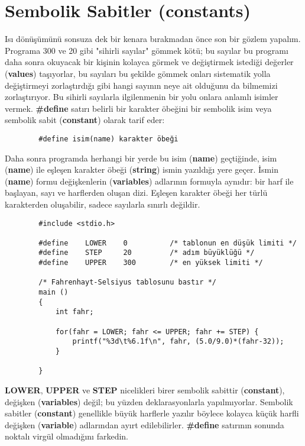 \documentclass[a4paper,12pt,oneside]{book}
\begin{document}
\section{Sembolik Sabitler (constants)}

\par Isı dönüşümünü sonsuza dek bir kenara bırakmadan önce son bir gözlem yapalım. Programa 300 ve 20 gibi "sihirli sayılar" gömmek kötü; bu sayılar bu programı daha sonra okuyacak bir kişinin kolayca görmek ve değiştirmek istediği değerler (\textbf{values}) taşıyorlar, bu sayıları bu şekilde gömmek onları sistematik yolla değiştirmeyi zorlaştırdığı gibi hangi sayının neye ait olduğunu da bilmemizi zorlaştırıyor. Bu sihirli sayılarla ilgilenmenin bir yolu onlara anlamlı isimler vermek. \textbf{\#define} satırı belirli bir karakter öbeğini bir sembolik isim veya sembolik sabit (\textbf{constant}) olarak tarif eder:
\begin{lstlisting}
		#define isim(name) karakter öbeği
\end{lstlisting}
Daha sonra programda herhangi bir yerde bu isim (\textbf{name}) geçtiğinde, isim (\textbf{name}) ile eşleşen karakter öbeği (\textbf{string}) ismin yazıldığı yere geçer. İsmin (\textbf{name}) formu değişkenlerin (\textbf{variables}) adlarının formuyla aynıdır: bir harf ile başlayan, sayı ve harflerden oluşan dizi. Eşleşen karakter öbeği her türlü karakterden oluşabilir, sadece sayılarla sınırlı değildir.
\begin{lstlisting}
		#include <stdio.h>

		#define    LOWER    0          /* tablonun en düşük limiti */
		#define    STEP     20		   /* adım büyüklüğü */
		#define    UPPER    300        /* en yüksek limiti */

		/* Fahrenhayt-Selsiyus tablosunu bastır */
		main ()
		{
			int fahr;

			for(fahr = LOWER; fahr <= UPPER; fahr += STEP) {
				printf("%3d\t%6.1f\n", fahr, (5.0/9.0)*(fahr-32));
			}

		}
\end{lstlisting}

\textbf{LOWER}, \textbf{UPPER} ve \textbf{STEP} nicelikleri birer sembolik sabittir (\textbf{constant}), değişken (\textbf{variables}) değil; bu yüzden deklarasyonlarla yapılmıyorlar. Sembolik sabitler (\textbf{constant}) genellikle büyük harflerle yazılır böylece kolayca küçük harfli değişken (\textbf{variable}) adlarından ayırt edilebilirler. \textbf{\#define} satırının sonunda noktalı virgül olmadığını farkedin. \pagebreak
\end{document}
